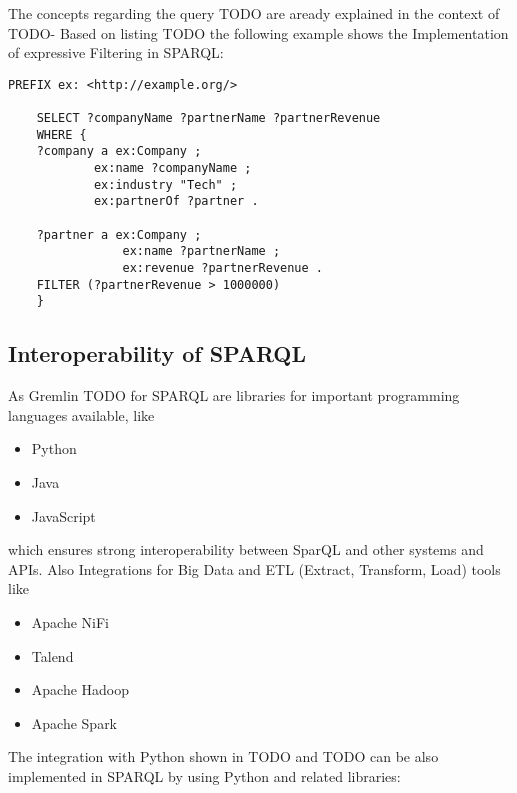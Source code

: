 The concepts regarding the query TODO are aready explained in the context of TODO-
Based on listing TODO the following example shows the Implementation of expressive Filtering in
SPARQL:
\begin{lstlisting}[caption={Expressive Filtering in SPARQL}, label={lst:aggFuncSPARQL}]
	PREFIX ex: <http://example.org/>

	SELECT ?companyName ?partnerName ?partnerRevenue
	WHERE {
	?company a ex:Company ;
			ex:name ?companyName ;
			ex:industry "Tech" ;
			ex:partnerOf ?partner .
	
	?partner a ex:Company ;
				ex:name ?partnerName ;
				ex:revenue ?partnerRevenue .
	FILTER (?partnerRevenue > 1000000)
	}
\end{lstlisting}

\subsection{Interoperability of SPARQL}
\label{subsec:different_query_languages_for_graph_databases:sparql:interoperability}
As Gremlin TODO for SPARQL are libraries for important programming languages available, like 
\begin{itemize}
	\item Python
	\item Java
	\item JavaScript
\end{itemize}
which ensures strong interoperability between SparQL and other systems and APIs. 
Also Integrations for Big Data and ETL (Extract, Transform, Load) tools like 
\begin{itemize}
	\item Apache NiFi
	\item Talend 
	\item Apache Hadoop
	\item Apache Spark
\end{itemize}
The integration with Python shown in TODO and TODO can be also implemented in SPARQL by using 
Python and related libraries:
